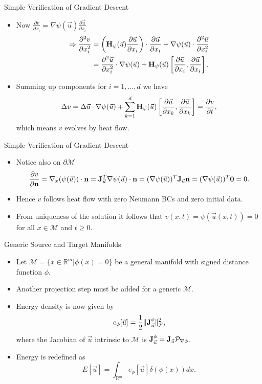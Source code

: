 \documentclass{beamer}
\begin{document}
\begin{frame}{Simple Verification of Gradient Descent}
  \begin{itemize}
\item Now $\frac{\partial v}{\partial x_i} = \nabla \psi (\vec{u}) \frac{\partial \vec{u}}{\partial x_i}$ 
\begin{align*}
\Rightarrow \frac{\partial^2 v}{\partial x_i^2} &= \left( {\bf H}_{\psi} (\vec{u}) \frac{\partial \vec{u}}{\partial   x_i} \right) \cdot \frac{\partial \vec{u}}{\partial x_i} + \nabla \psi(\vec{u}) \cdot \frac{\partial^2 \vec{u}}{\partial x_i^2}\\
& = \frac{\partial^2 \vec{u}}{\partial x_i^2} \cdot \nabla \psi (\vec{u}) + {\bf H}_{\psi} (\vec{u}) \left[\frac{\partial \vec{u}}{\partial x_i},\frac{\partial \vec{u}}{\partial x_i}\right].
\end{align*}
\item Summing up components for $i = 1,\ldots,d$ we have
$$\Delta v = \Delta \vec{u} \cdot \nabla \psi (\vec{u}) + \sum_{k=1}^d {\bf H}_{\psi} (\vec{u}) \left[\frac{\partial \vec{u}}{\partial x_k},\frac{\partial \vec{u}}{\partial x_k}\right] = \frac{\partial v}{\partial t},$$
which means $v$ evolves by heat flow.
\end{itemize}
\end{frame}

\begin{frame}{Simple Verification of Gradient Descent}
  \begin{itemize}
\item Notice also on $\partial \mathcal{M}$ $$\frac{\partial v}{\partial {\bf n}} = \nabla_x (\psi(\vec{u})) \cdot {\bf n} = {\bf J}_{\vec{u}}^T \nabla \psi (\vec{u}) \cdot {\bf n} = (\nabla \psi (\vec{u}))^T {\bf J}_{\vec{u}} {\bf n} =  (\nabla \psi (\vec{u}))^T {\bf 0} = 0.$$
\item Hence $v$ follows heat flow with zero Neumann BCs and zero initial data.
\item From uniqueness of the solution it follows that $v(x,t) = \psi(\vec{u}(x,t)) = 0$ for all $ x\in \mathcal{M}$ and  $t\geq 0.$
\end{itemize}
\end{frame}

\begin{frame}{Generic Source and Target Manifolds}
\begin{itemize}
\item Let $\mathcal{M} = \{x\in \mathbb{R}^m| \phi(x) = 0\}$  be a general manifold with signed distance function $\phi.$
\item Another projection step must be added for a generic $\mathcal{M}.$
\item Energy density is now given by $$e_{\phi}[\vec{u}] = \frac{1}{2} \| {\bf J}_{\vec{u}}^{\phi} \|^2_{\mathcal{F}},$$ where the Jacobian of $\vec{u}$ intrinsic to $\mathcal{M}$ is ${\bf J}_{\vec{u}}^{\phi} = {\bf J}_{\vec{u}} \mathcal{P}_{\nabla \phi}.$
\item Energy is redefined as $$E[\vec{u}] = \int_{\mathbb{R}^m} e_{\phi}[\vec{u}] \delta(\phi(x)) dx.$$
\end{itemize}
\end{frame}
\end{document}
